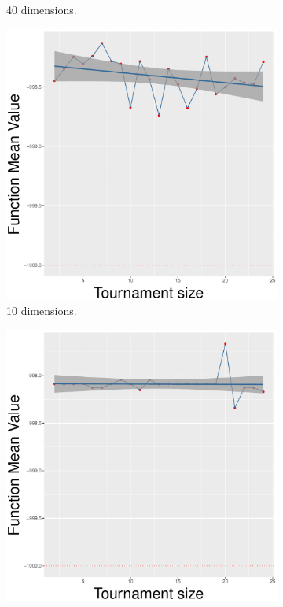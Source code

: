 \begin{figure}[!t]
\begin{subfigure}[b]{0.33\textwidth}
		\caption{40 dimensions.}
	\end{subfigure}
	\caption{Uniform crossover - ($\lambda, \lambda$) scheme.}
	\label{uniform-22-a}
	\begin{subfigure}[b]{0.33\textwidth}
		\centering
		\includegraphics[width=\textwidth]{img/2n2n-10D/multimodal_2n2n_22_dim_10.pdf}
		\caption{10 dimensions.}
	\end{subfigure}
	\begin{subfigure}[b]{0.33\textwidth}
		\centering
		\includegraphics[width=\textwidth]{img/2n2n-20D/multimodal_2n2n_22_dim_20.pdf}

\end{subfigure}
\end{figure}
